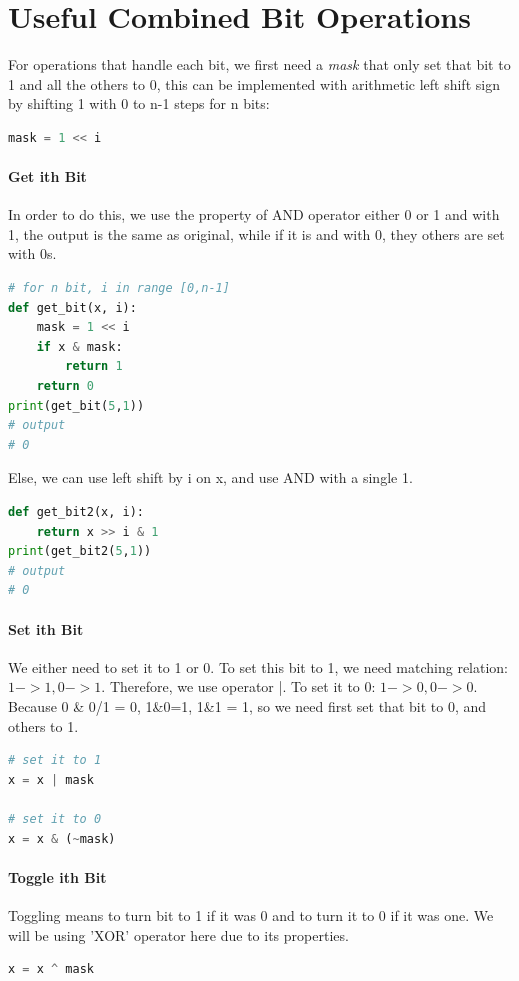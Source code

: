 \documentclass[../main.tex]{subfiles}
\begin{document}
\section{Useful Combined Bit Operations}
\label{sec_useful_bit_combination}

For operations that handle each bit, we first need a \textit{mask} that only set that bit to 1 and all the others to 0, this can be implemented with arithmetic left shift sign by shifting 1 with 0 to n-1 steps for n bits: 
\begin{lstlisting}[language=Python]
mask = 1 << i
\end{lstlisting}
\paragraph{Get ith Bit} In order to do this, we use the property of AND operator either 0 or 1 and with 1, the output is the same as original, while if it is and with 0, they others are set with 0s.
\begin{lstlisting}[language=Python]
# for n bit, i in range [0,n-1]
def get_bit(x, i):
    mask = 1 << i
    if x & mask:
        return 1
    return 0
print(get_bit(5,1))
# output 
# 0
\end{lstlisting}
Else, we can use left shift by i on x, and use AND with a single 1.
\begin{lstlisting}[language=Python]
def get_bit2(x, i):
    return x >> i & 1
print(get_bit2(5,1))
# output 
# 0
\end{lstlisting}

\paragraph{Set ith Bit} We either need to set it to 1 or 0. To set this bit to 1, we need matching relation: $1->1, 0->1$. Therefore, we use operator |. To set it to 0: $1->0, 0->0$. Because 0 \& 0/1 = 0, 1\&0=1, 1\&1 = 1, so we need first set that bit to 0, and others to 1. 
\begin{lstlisting}[language=Python]
# set it to 1
x = x | mask

# set it to 0
x = x & (~mask)
\end{lstlisting}

\paragraph{Toggle ith Bit} Toggling means to turn bit to 1 if it was 0 and to turn it to 0 if it was one. We will be using 'XOR' operator here due to its properties. 
\begin{lstlisting}[language=Python]
x = x ^ mask
\end{lstlisting}
\end{document}
